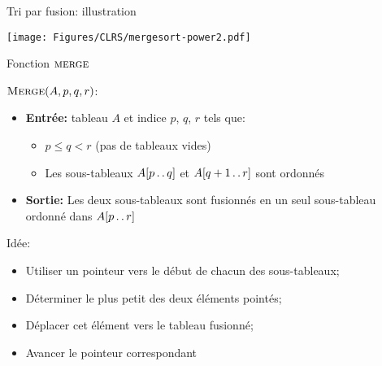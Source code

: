\begin{frame}{Tri par fusion: illustration}

\centerline{\texttt{[image: Figures/CLRS/mergesort-power2.pdf]}}


\end{frame}

\begin{frame}{Fonction $\textnormal{\scshape merge}$}

$\textnormal{\scshape Merge}(A,p,q,r)$:
\begin{itemize}
\item {\bf Entrée:} tableau $A$ et indice $p$, $q$, $r$ tels que:
\begin{itemize}
\item $p\leq q<r$ (pas de tableaux vides)
\item Les sous-tableaux $A[p\mathinner{\ldotp\ldotp} q]$ et $A[q+1\mathinner{\ldotp\ldotp} r]$ sont ordonnés
\end{itemize}
\item {\bf Sortie:} Les deux sous-tableaux sont fusionnés en un seul sous-tableau ordonné dans $A[p\mathinner{\ldotp\ldotp} r]$
\end{itemize}

\bigskip

Idée:
\begin{itemize}
\item Utiliser un pointeur vers le début de chacun des sous-tableaux;
\item Déterminer le plus petit des deux éléments pointés;
\item Déplacer cet élément vers le tableau fusionné;
\item Avancer le pointeur correspondant
\end{itemize}


\end{frame}


